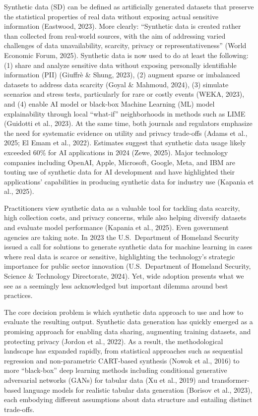 \documentclass[12pt,a4paper]{article}
\begin{document}
Synthetic data (SD) can be defined as artificially generated datasets that preserve the statistical properties of real data without exposing actual sensitive information (Eastwood, 2023). More clearly: ``Synthetic data is created rather than collected from real-world sources, with the aim of addressing varied challenges of data unavailability, scarcity, privacy or representativeness'' (World Economic Forum, 2025). Synthetic data is now used to do at least the following: (1) share and analyze sensitive data without exposing personally identifiable information (PII) (Giuffr\`{e} \& Shung, 2023), (2) augment sparse or imbalanced datasets to address data scarcity (Goyal \& Mahmoud, 2024), (3) simulate scenarios and stress tests, particularly for rare or costly events (WEKA, 2023), and (4) enable AI model or black-box Machine Learning (ML) model explainability through local ``what-if'' neighborhoods in methods such as LIME (Guidotti et al., 2023). At the same time, both journals and regulators emphasize the need for systematic evidence on utility and privacy trade-offs (Adams et al., 2025; El Emam et al., 2022). Estimates suggest that synthetic data usage likely exceeded 60\% for AI applications in 2024 (Zewe, 2025). Major technology companies including OpenAI, Apple, Microsoft, Google, Meta, and IBM are touting use of synthetic data for AI development and have highlighted their applications' capabilities in producing synthetic data for industry use (Kapania et al., 2025).

Practitioners view synthetic data as a valuable tool for tackling data scarcity, high collection costs, and privacy concerns, while also helping diversify datasets and evaluate model performance (Kapania et al., 2025). Even government agencies are taking note. In 2023 the U.S.\ Department of Homeland Security issued a call for solutions to generate synthetic data for machine learning in cases where real data is scarce or sensitive, highlighting the technology's strategic importance for public sector innovation (U.S.\ Department of Homeland Security, Science \& Technology Directorate, 2024). Yet, wide adoption presents what we see as a seemingly less acknowledged but important dilemma around best practices.

The core decision problem is which synthetic data approach to use and how to evaluate the resulting output. Synthetic data generation has quickly emerged as a promising approach for enabling data sharing, augmenting training datasets, and protecting privacy (Jordon et al., 2022). As a result, the methodological landscape has expanded rapidly, from statistical approaches such as sequential regression and non-parametric CART-based synthesis (Nowok et al., 2016) to more ``black-box'' deep learning methods including conditional generative adversarial networks (GANs) for tabular data (Xu et al., 2019) and transformer-based language models for realistic tabular data generation (Borisov et al., 2023), each embodying different assumptions about data structure and entailing distinct trade-offs.
\end{document}
